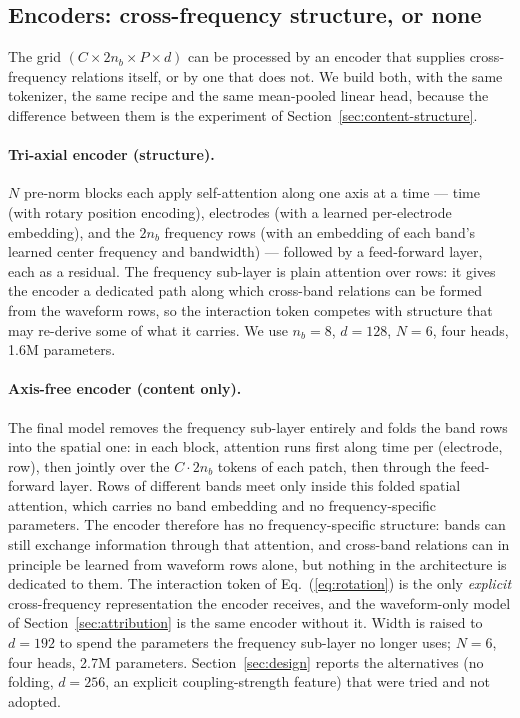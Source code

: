 \subsection{Encoders: cross-frequency structure, or none}
\label{sec:encoder}

The grid $(C \times 2n_b \times P \times d)$ can be processed by an encoder
that supplies cross-frequency relations itself, or by one that does not.
We build both, with the same tokenizer, the same recipe and the same
mean-pooled linear head, because the difference between them is the
experiment of Section~\ref{sec:content-structure}.

\paragraph{Tri-axial encoder (structure).}
$N$ pre-norm blocks each apply self-attention along one axis at a time ---
time (with rotary position encoding), electrodes (with a learned
per-electrode embedding), and the $2n_b$ frequency rows (with an embedding
of each band's learned center frequency and bandwidth) --- followed by a
feed-forward layer, each as a residual. The frequency sub-layer is plain
attention over rows: it gives the encoder a dedicated path along which
cross-band relations can be formed from the waveform rows, so the
interaction token competes with structure that may re-derive some of what
it carries. We use
$n_b{=}8$, $d{=}128$, $N{=}6$, four heads, 1.6M parameters.

\paragraph{Axis-free encoder (content only).}
The final model removes the frequency sub-layer entirely and folds the band
rows into the spatial one: in each block, attention runs first along time
per (electrode, row), then jointly over the $C \cdot 2n_b$ tokens of each
patch, then through the feed-forward layer. Rows of different bands meet
only inside this folded spatial attention, which carries no band
embedding and no frequency-specific parameters. The encoder therefore has
no frequency-specific structure: bands can still exchange information
through that attention, and cross-band relations can in principle be
learned from waveform rows alone, but nothing in the architecture is
dedicated to them. The interaction token of Eq.~(\ref{eq:rotation}) is
the only \emph{explicit} cross-frequency representation the encoder
receives, and the waveform-only model of Section~\ref{sec:attribution}
is the same encoder without it. Width is raised
to $d{=}192$ to spend the parameters the frequency sub-layer no longer
uses; $N{=}6$, four heads, 2.7M parameters. Section~\ref{sec:design}
reports the alternatives (no folding, $d{=}256$, an explicit
coupling-strength feature) that were tried and not adopted.

